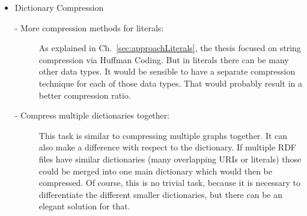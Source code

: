 \begin{itemize}
\begin{description}
	\end{description}
	\item Dictionary Compression
	\begin{description}
		\item [- More compression methods for literals:] As explained in Ch.~\ref{sec:approachLiterals}, the thesis focused on string compression via Huffman Coding. But in literals there can be many other data types. It would be sensible to have a separate compression technique for each of those data types. That would probably result in a better compression ratio.
		\item[- Compress multiple dictionaries together:] This task is similar to compressing multiple graphs together. It can also make a difference with respect to the dictionary. If multiple RDF files have similar dictionaries (many overlapping URIs or literals) those could be merged into one main dictionary which would then be compressed. Of course, this is no trivial task, because it is necessary to differentiate the different smaller dictionaries, but there can be an elegant solution for that.
	\end{description}
\end{itemize}


